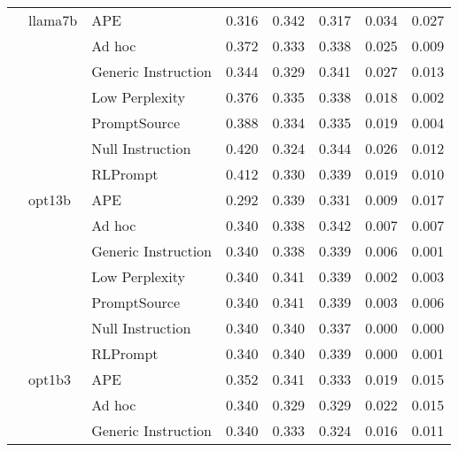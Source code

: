 \begin{supertabular}{lllrrrrr}
              & llama7b & APE &            0.316 &           0.342 &          0.317 &        0.034 &    0.027 \\
              &        & Ad hoc &            0.372 &           0.333 &          0.338 &        0.025 &    0.009 \\
              &        & Generic Instruction &            0.344 &           0.329 &          0.341 &        0.027 &    0.013 \\
              &        & Low Perplexity &            0.376 &           0.335 &          0.338 &        0.018 &    0.002 \\
              &        & PromptSource &            0.388 &           0.334 &          0.335 &        0.019 &    0.004 \\
              &        & Null Instruction &            0.420 &           0.324 &          0.344 &        0.026 &    0.012 \\
              &        & RLPrompt &            0.412 &           0.330 &          0.339 &        0.019 &    0.010 \\
              & opt13b & APE &            0.292 &           0.339 &          0.331 &        0.009 &    0.017 \\
              &        & Ad hoc &            0.340 &           0.338 &          0.342 &        0.007 &    0.007 \\
              &        & Generic Instruction &            0.340 &           0.338 &          0.339 &        0.006 &    0.001 \\
              &        & Low Perplexity &            0.340 &           0.341 &          0.339 &        0.002 &    0.003 \\
              &        & PromptSource &            0.340 &           0.341 &          0.339 &        0.003 &    0.006 \\
              &        & Null Instruction &            0.340 &           0.340 &          0.337 &        0.000 &    0.000 \\
              &        & RLPrompt &            0.340 &           0.340 &          0.339 &        0.000 &    0.001 \\
              & opt1b3 & APE &            0.352 &           0.341 &          0.333 &        0.019 &    0.015 \\
              &        & Ad hoc &            0.340 &           0.329 &          0.329 &        0.022 &    0.015 \\
              &        & Generic Instruction &            0.340 &           0.333 &          0.324 &        0.016 &    0.011 \\

\end{supertabular}
